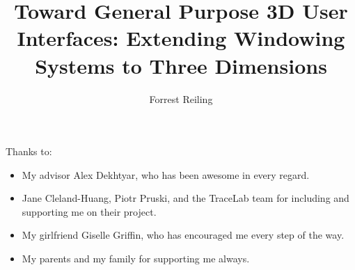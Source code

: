 \documentclass[12pt]{ucthesis}
\begin{document}

\title{Toward General Purpose 3D User Interfaces: Extending Windowing Systems to 
Three Dimensions}
\author{Forrest Reiling}
  
 
     



\maketitle

\begin{frontmatter}

\copyrightpage

\committeemembershippage

\begin{abstract}




\end{abstract}

\begin{acknowledgements}

Thanks to:

\begin{itemize}
\item My advisor Alex Dekhtyar, who has been awesome in every regard.
\item Jane Cleland-Huang, Piotr Pruski, and the TraceLab team for including and supporting me on their project.
\item My girlfriend Giselle Griffin, who has encouraged me every step of the way.
\item My parents and my family for supporting me always.
\end{itemize}

\end{acknowledgements}

\tableofcontents

\listoftables

\listoffigures

\end{frontmatter}
\end{document}
